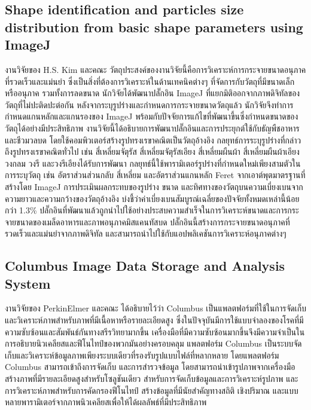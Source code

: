 \documentclass[12pt,oneside,openright,a4paper]{cpe-thai-project}
\begin{document}
\subsection{Shape identification and particles size distribution from basic shape parameters using ImageJ}
งานวิจัยของ  H.S. Kim และคณะ  \cite{35} วัตถุประสงค์ของงานวิจัยนี้คือการวิเคราะห์การกระจายขนาดอนุภาคที่รวดเร็วและแม่นยำ ซึ่งเป็นสิ่งที่ต้องการวิเคราะห์ในด้านเทคนิคต่างๆ ที่จัดการกับวัตถุที่มีขนาดเล็กหรืออนุภาค รวมทั้งการลดขนาด นักวิจัยได้พัฒนาปลั๊กอิน ImageJ ที่แยกมิติออกจากภาพดิจิทัลของวัตถุที่ไม่ปะติดปะต่อกัน หลังจากระบุรูปร่างและกำหนดการกระจายขนาดวัตถุแล้ว นักวิจัยจึงทำการกำหนดแกนหลักและแกนรองของ ImageJ พร้อมกับปัจจัยการแก้ไขที่พัฒนาขึ้นซึ่งกำหนดขนาดของวัตถุได้อย่างมีประสิทธิภาพ งานวิจัยนี้ได้อธิบายการพัฒนาปลั๊กอินและการประยุกต์ใช้กับธัญพืชอาหารและชีวมวลบด โดยใช้คอมพิวเตอร์สร้างรูปทรงเรขาคณิตเป็นวัตถุอ้างอิง กลยุทธ์การระบุรูปร่างที่กล่าวถึงรูปทรงเรขาคณิตทั่วไป เช่น สี่เหลี่ยมจัตุรัส สี่เหลี่ยมจัตุรัสเอียง สี่เหลี่ยมผืนผ้า สี่เหลี่ยมผืนผ้าเอียง วงกลม วงรี และวงรีเอียงได้รับการพัฒนา กลยุทธ์นี้ใช้พารามิเตอร์รูปร่างที่กำหนดใหม่เพียงสามตัวในการระบุวัตถุ เช่น อัตราส่วนส่วนกลับ สี่เหลี่ยม และอัตราส่วนแกนหลัก Feret จากเอาต์พุตมาตรฐานที่สร้างโดย ImageJ การประเมินผลกระทบของรูปร่าง ขนาด และทิศทางของวัตถุบนความเบี่ยงเบนจากความยาวและความกว้างของวัตถุอ้างอิง บ่งชี้ว่าค่าเบี่ยงเบนสัมบูรณ์เฉลี่ยของปัจจัยทั้งหมดเหล่านี้น้อยกว่า 1.3\% ปลั๊กอินที่พัฒนาแล้วถูกนำไปใช้อย่างประสบความสำเร็จในการวิเคราะห์ขนาดและการกระจายขนาดของเมล็ดอาหารและภาพอนุภาคมิสแคนทัสบด ปลั๊กอินนี้สร้างการกระจายขนาดอนุภาคที่รวดเร็วและแม่นยำจากภาพดิจิทัล และสามารถนำไปใช้กับแอปพลิเคชันการวิเคราะห์อนุภาคต่างๆ
\subsection{Columbus Image Data Storage and Analysis System}
งานวิจัยของ PerkinElmer และคณะ \cite{11} ได้อธิบายไว้ว่า Columbus เป็นแพลตฟอร์มที่ใช้ในการจัดเก็บและวิเคราะห์ภาพสำหรับภาพที่มีเนื้อหาหรือรายละเอียดสูง ซึ่งในปัจจุบันมีการใช้แบบจำลองของโรคที่มีความซับซ้อนและสัมพันธ์กันทางสรีรวิทยามากขึ้น เครื่องมือที่มีความซับซ้อนมากขึ้นจึงมีความจำเป็นในการอธิบายนิวเคลียสและฟีโนไทป์ของพวกมันอย่างครอบคลุม แพลตฟอร์ม Columbus เป็นระบบจัดเก็บและวิเคราะห์ข้อมูลภาพเพียงระบบเดียวที่รองรับรูปแบบไฟล์ที่หลากหลาย โดยแพลตฟอร์ม Columbus สามารถเข้าถึงการจัดเก็บ และการสำรวจข้อมูล โดยสามารถนำเข้ารูปภาพจากเครื่องมือสร้างภาพที่มีรายละเอียดสูงสำหรับโซลูชันเดียว สำหรับการจัดเก็บข้อมูลและการวิเคราะห์รูปภาพ และการวิเคราะห์ภาพสำหรับการคัดกรองฟีโนไทป์ สร้างข้อมูลที่มีนัยสำคัญทางสถิติ เชิงปริมาณ และแบบหลายพารามิเตอร์จากภาพนิวเคลียสเพื่อให้ได้ผลลัพธ์ที่มีประสิทธิภาพ \cite{11}
\end{document}
